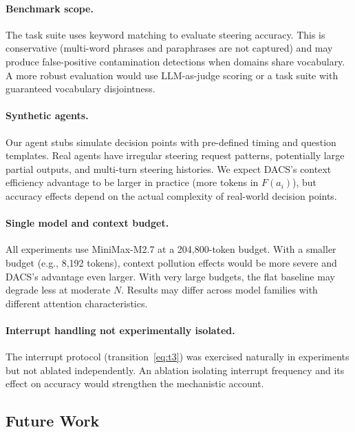 \documentclass{article}
\begin{document}
\paragraph{Benchmark scope.}
The task suite uses keyword matching to evaluate steering accuracy.
This is conservative (multi-word phrases and paraphrases are not captured)
and may produce false-positive contamination detections when domains share
vocabulary.
A more robust evaluation would use LLM-as-judge scoring or a task suite
with guaranteed vocabulary disjointness.

\paragraph{Synthetic agents.}
Our agent stubs simulate decision points with pre-defined timing and
question templates.
Real agents have irregular steering request patterns, potentially large
partial outputs, and multi-turn steering histories.
We expect DACS's context efficiency advantage to be larger in practice
(more tokens in $F(a_i)$), but accuracy effects depend on the actual
complexity of real-world decision points.

\paragraph{Single model and context budget.}
All experiments use MiniMax-M2.7 at a 204{,}800-token budget.
With a smaller budget (e.g., 8{,}192 tokens), context pollution effects
would be more severe and DACS's advantage even larger.
With very large budgets, the flat baseline may degrade less at moderate
$N$.
Results may differ across model families with different attention
characteristics.

\paragraph{Interrupt handling not experimentally isolated.}
The interrupt protocol (transition~\eqref{eq:t3}) was exercised naturally in
experiments but not ablated independently.
An ablation isolating interrupt frequency and its effect on accuracy would
strengthen the mechanistic account.

\subsection{Future Work}
\end{document}
